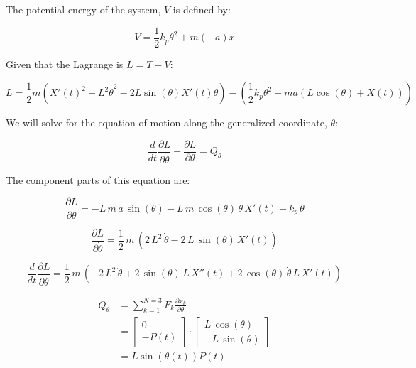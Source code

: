 \documentclass[12pt, letterpaper]{../assignment}
\begin{document}
The potential energy of the system, $V$ is defined by:

$$ V = \frac{1}{2} k_p \theta^2 + m (-a) x $$


Given that the Lagrange is $ L = T - V $:

$$ L = \frac{1}{2} m \left(X'(t)^2 + L^2\dot{\theta}^2 - 2 L \sin(\theta)X'(t)\dot{\theta}\right)- \left( \frac{1}{2} k_p \theta^2 - m a \left(L\cos(\theta)+X(t)\right) \right)$$

We will solve for the equation of motion along the generalized coordinate, $\theta$:

$$ \frac{d}{d t} \frac{\partial L}{\partial \dot{\theta}} - \frac{\partial L}{\partial \theta} = Q_\theta $$

The component parts of this equation are:




$$ \frac{\partial L}{\partial \theta} = 
-L\,m\,a\,\sin\left(\theta\right)-L\,m\,\cos\left(\theta\right)\,\dot{\theta}\,X'\left(t\right)-k_{p}\,\theta  $$

$$ \frac{\partial L}{\partial \dot{\theta}}  =
\frac{1}{2}\,m\,\left(2\,L^2\,\dot{\theta}-2\,L\,\sin\left(\theta\right)\,X'\left(t\right)\right) $$

$$ \frac{d}{d t} \frac{\partial L}{\partial \dot{\theta}} =
\frac{1}{2}\,m\,\left(-2\,L^2\,\ddot{\theta}+2\,\sin\left(\theta\right)\,L\,X''\left(t\right)+2\,\cos\left(\theta\right)\,\dot{\theta}\,L\,X'\left(t\right)\right)  $$

\begin{equation*}
\begin{aligned}
Q_\theta &= \sum_{k=1}^{N=3} F_k \frac{\partial x_k }{\partial \theta}\\
&=\left[\begin{array}{r} 0\\ -P\left(t\right) \end{array}\right] \cdot \left[\begin{array}{r} L\,\cos\left(\theta \right)\\ -L\,\sin\left(\theta \right) \end{array}\right]\\
&= L\sin(\theta(t)) P(t)
\end{aligned}
\end{equation*}
\end{document}
